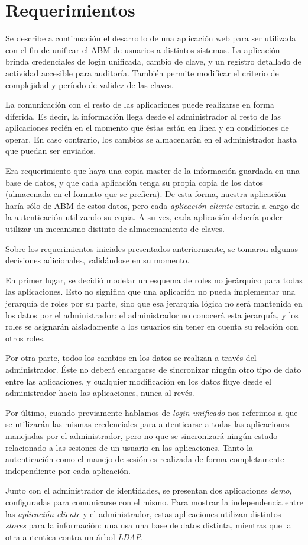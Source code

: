 \section{Requerimientos}

Se describe a continuación el desarrollo de una aplicación web para ser utilizada con el fin de
unificar el ABM de usuarios a distintos sistemas. La aplicación brinda credenciales de login unificada,
cambio de clave, y un registro detallado de actividad accesible para auditoría. También permite modificar
el criterio de complejidad y período de validez de las claves.

La comunicación con el resto de las aplicaciones puede realizarse en forma diferida. Es decir, la información
llega desde el administrador al resto de las aplicaciones recién en el momento que éstas están en línea
y en condiciones de operar. En caso contrario, los cambios se almacenarán en el administrador hasta
que puedan ser enviados.

Era requerimiento que haya una copia master de la información guardada en una base de datos, y que cada
aplicación tenga su propia copia de los datos (almacenada en el formato que se prefiera). De esta forma,
nuestra aplicación haría sólo de ABM de estos datos, pero cada \textit{aplicación cliente} estaría a cargo 
de la autenticación utilizando su copia. A su vez, cada aplicación debería poder utilizar un mecanismo distinto
de almacenamiento de claves.

Sobre los requerimientos iniciales presentados anteriormente, se tomaron algunas decisiones adicionales,
validándose en su momento.

En primer lugar, se decidió modelar un esquema de roles no jerárquico para todas las aplicaciones. Esto no
significa que una aplicación no pueda implementar una jerarquía de roles por su parte, sino que esa jerarquía
lógica no será mantenida en los datos por el administrador: el administrador no conocerá esta jerarquía, y los
roles se asignarán aisladamente a los usuarios sin tener en cuenta su relación con otros roles.

Por otra parte, todos los cambios en los datos se realizan a través del administrador. Éste no deberá encargarse
de sincronizar ningún otro tipo de dato entre las aplicaciones, y cualquier modificación en los datos fluye
desde el administrador hacia las aplicaciones, nunca al revés.

Por último, cuando previamente hablamos de \textit{login unificado} nos referimos a que se utilizarán las mismas
credenciales para autenticarse a todas las aplicaciones manejadas por el administrador, pero no que se sincronizará
ningún estado relacionado a las sesiones de un usuario en las aplicaciones. Tanto la autenticación como el manejo
de sesión es realizada de forma completamente independiente por cada aplicación.

Junto con el administrador de identidades, se presentan dos aplicaciones \textit{demo}, configuradas para 
comunicarse con el mismo. Para mostrar la independencia entre las \textit{aplicación cliente} y el administrador,
estas aplicaciones utilizan distintos \textit{stores} para la información: una usa una base de datos distinta,
mientras que la otra autentica contra un árbol \textit{LDAP}.
